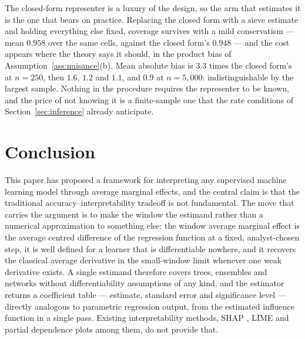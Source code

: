 \documentclass[12pt,a4paper]{article}
\numberwithin{equation}{section}
\theoremstyle{plain}
\theoremstyle{definition}
\begin{document}
	The closed-form representer is a luxury of the design, so the arm that
	estimates it is the one that bears on practice. Replacing the closed form
	with a sieve estimate and holding everything else fixed, coverage survives
	with a mild conservatism --- mean $0.958$ over the same cells, against the
	closed form's $0.948$ --- and the cost appears where the theory says it
	should, in the product bias of Assumption~\ref{ass:nuisance}(b). Mean
	absolute bias is $3.3$ times the closed form's at $n=250$, then $1.6$,
	$1.2$ and $1.1$, and $0.9$ at $n=5{,}000$: indistinguishable by the largest
	sample. Nothing in the procedure requires the representer to be known, and
	the price of not knowing it is a finite-sample one that the rate conditions
	of Section~\ref{sec:inference} already anticipate.

	\section{Conclusion}
	\label{sec:conclusion}

	This paper has proposed a framework for interpreting any supervised machine
	learning model through average marginal effects, and the central claim is
	that the traditional accuracy--interpretability tradeoff is not fundamental.
	The move that carries the argument is to make the window the estimand rather
	than a numerical approximation to something else: the window average marginal
	effect is the average centred difference of the regression function at a
	fixed, analyst-chosen step, it is well defined for a learner that is
	differentiable nowhere, and it recovers the classical average derivative in
	the small-window limit whenever one weak derivative exists. A single estimand
	therefore covers trees, ensembles and networks without differentiability
	assumptions of any kind, and the estimator returns a coefficient table ---
	estimate, standard error and significance level --- directly analogous to
	parametric regression output, from the estimated influence function in a
	single pass. Existing interpretability methods, SHAP
	\citep{lundberg2017shap}, LIME \citep{ribeiro2016lime} and partial dependence
	plots \citep{friedman2001pdp} among them, do not provide that.
\end{document}
